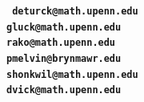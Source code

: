 \documentclass[11pt]{amsart}
\theoremstyle{definition}
\begin{document}
% 
% 
% 
% 
% 
% 
% 
% 
% 
% 


\bigskip

\noindent\bf\tt
deturck@math.upenn.edu \\
gluck@math.upenn.edu \\
rako@math.upenn.edu \\
pmelvin@brynmawr.edu \\
shonkwil@math.upenn.edu \\
dvick@math.upenn.edu
\end{document}
